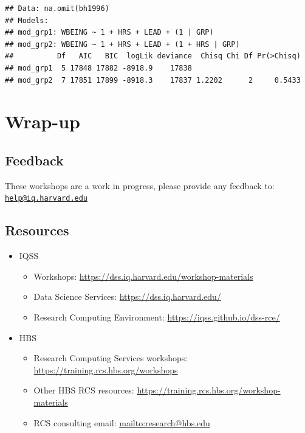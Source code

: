 \documentclass[]{book}
\providecommand{\tightlist}{%
  \setlength{\itemsep}{0pt}\setlength{\parskip}{0pt}}
\begin{document}
\begin{verbatim}
## Data: na.omit(bh1996)
## Models:
## mod_grp1: WBEING ~ 1 + HRS + LEAD + (1 | GRP)
## mod_grp2: WBEING ~ 1 + HRS + LEAD + (1 + HRS | GRP)
##          Df   AIC   BIC  logLik deviance  Chisq Chi Df Pr(>Chisq)
## mod_grp1  5 17848 17882 -8918.9    17838                         
## mod_grp2  7 17851 17899 -8918.3    17837 1.2202      2     0.5433
\end{verbatim}

\hypertarget{wrap-up-2}{%
\section{Wrap-up}\label{wrap-up-2}}

\hypertarget{feedback-2}{%
\subsection{Feedback}\label{feedback-2}}

These workshops are a work in progress, please provide any feedback to: \href{mailto:help@iq.harvard.edu}{\nolinkurl{help@iq.harvard.edu}}

\hypertarget{resources-3}{%
\subsection{Resources}\label{resources-3}}

\begin{itemize}
\tightlist
\item
  IQSS

  \begin{itemize}
  \tightlist
  \item
    Workshops: \url{https://dss.iq.harvard.edu/workshop-materials}
  \item
    Data Science Services: \url{https://dss.iq.harvard.edu/}
  \item
    Research Computing Environment: \url{https://iqss.github.io/dss-rce/}
  \end{itemize}
\item
  HBS

  \begin{itemize}
  \tightlist
  \item
    Research Computing Services workshops: \url{https://training.rcs.hbs.org/workshops}
  \item
    Other HBS RCS resources: \url{https://training.rcs.hbs.org/workshop-materials}
  \item
    RCS consulting email: \url{mailto:research@hbs.edu}
  \end{itemize}
\end{itemize}
\end{document}
